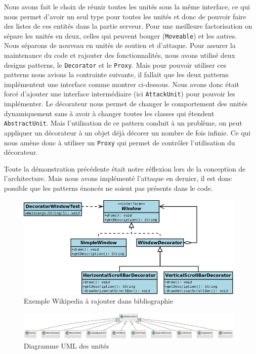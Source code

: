 Nous avons fait le choix de réunir toutes les unités sous la même interface, ce qui nous permet d'avoir un seul type pour toutes les unités et donc de pouvoir faire des listes de ces entités dans la partie serveur.
Pour une meilleure factorisation on sépare les unités en deux, celles qui peuvent bouger (\lstinline{Moveable}) et les autres. Nous séparons de nouveau en unités de soutien et d'attaque. Pour assurer la maintenance du code et rajouter des fonctionnalités, nous avons utilisé deux designs patterns, le \lstinline{Decorator} et le \lstinline{Proxy}. Mais pour pouvoir utiliser ces patterns nous avions la contrainte suivante, il fallait que les deux patterns implémentent une interface comme montrer ci-dessous. Nous avons donc était forcé d'ajouter une interface intermédiaire (ici \lstinline{AttackUnit}) pour pouvoir les implémenter. Le décorateur nous permet de changer le comportement des unités dynamiquement sans à avoir à changer toutes les classes qui étendent \lstinline{AbstractUnit}. Mais l'utilisation de ce pattern conduit à un problème, on peut appliquer un décorateur à un objet déjà décorer un nombre de fois infinie. Ce qui nous amène donc à utiliser un \lstinline{Proxy} qui permet de contrôler l'utilisation du décorateur.

Toute la démonstration précédente était notre réflexion lors de la conception de l'architecture. Mais nous avons implémenté l'attaque en dernier, il est donc possible que les patterns énoncés ne soient pas présents dans le code.

\begin{figure}[H]
    \centering
    \includegraphics[scale=0.3]{data/UML_Decorator_Pattern_Exmple.png}
    \caption{Exemple Wikipedia à rajouter dans bibliographie}
\end{figure}

\begin{figure}[H]
    \centering
    \includegraphics[scale=0.3]{data/uml_abstract_unit.png}
    \caption{Diagramme UML des unités}
\end{figure}

